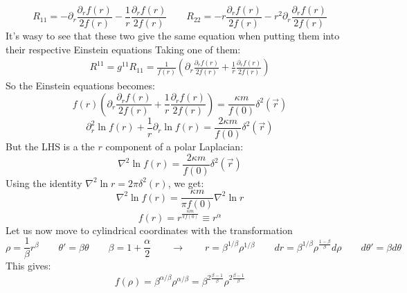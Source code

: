 \documentclass{article}
\begin{document}
\begin{equation}
    R_{11} =
    - \partial_r \frac{\partial_r f(r)}{2f(r)}
    - \frac{1}{r}\frac{\partial_r f(r)}{2f(r)}
    \qquad
    R_{22} =
    - r\frac{\partial_r f(r)}{2f(r)}
    - r^2 \partial_r \frac{\partial_{r}f(r)}{2f(r)}
\end{equation}
It's wasy to see that these two give the same equation when putting them into their respective Einstein equations
Taking one of them:
\begin{equation}
\begin{gathered}
    R^{11} = g^{11}R_{11} = 
    \frac{1}{f(r)}\left(\partial_r \frac{\partial_r f(r)}{2f(r)}
    + \frac{1}{r}\frac{\partial_r f(r)}{2f(r)}\right)
\end{gathered}
\end{equation}
So the Einstein equations becomes:
\begin{equation}
    f(r)\left(\partial_r \frac{\partial_r f(r)}{2f(r)}
    + \frac{1}{r}\frac{\partial_r f(r)}{2f(r)}\right) = \frac{\kappa m}{f(0)}\delta^2(\vec{r})
\end{equation}
\begin{equation}
    \partial_r^2 \ln f(r)
    + \frac{1}{r}\partial_r \ln f(r) = \frac{2\kappa m}{f(0)}\delta^2(\vec{r})
\end{equation}
But the LHS is a the $r$ component of a polar Laplacian:
\begin{equation}
    \nabla^2 \ln f(r) = \frac{2\kappa m}{f(0)}\delta^2(\vec{r})
\end{equation}
Using the identity $\nabla^2 \ln r = 2\pi \delta^2(r)$, we get:
\begin{equation}
    \nabla^2 \ln f(r) = \frac{\kappa m}{\pi f(0)}\nabla^2 \ln r
\end{equation}
\begin{equation}
    f(r) = r^{\frac{\kappa m}{\pi f(0)}} \equiv r^\alpha
\end{equation}
\newline
\newline
Let us now move to cylindrical coordinates with the transformation
\begin{equation}
    \rho = \frac{1}{\beta}r^{\beta}
    \qquad
    \theta' = \beta \theta
    \qquad
    \beta = 1 + \frac{\alpha}{2}
    \qquad
    \rightarrow
    \qquad
    r = \beta^{1/\beta}\rho^{1/\beta}
    \qquad
    dr = \beta^{1/\beta}\rho^{\frac{1 - \beta}{\beta}}d\rho
    \qquad
    d\theta' = \beta d\theta
\end{equation}
This gives:
\begin{equation}
    f(\rho) = \beta^{\alpha/\beta}\rho^{\alpha/\beta} = \beta^{2\frac{\beta-1}{\beta}}\rho^{2\frac{\beta-1}{\beta}}
\end{equation}
\end{document}
